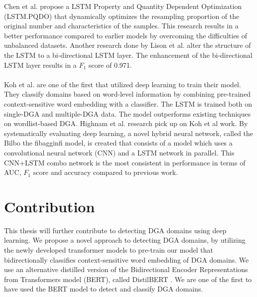 Chen et al. \cite{Chen} propose a LSTM Property and Quantity Dependent Optimization (LSTM.PQDO) that dynamically optimizes the resampling proportion of the original number and characteristics of the samples. This research results in a better performance compared to earlier models by overcoming the difficulties of unbalanced datasets. Another research done by Lison et al. \cite{Lison} alter the structure of the LSTM to a bi-directional LSTM layer. The enhancement of the bi-directional LSTM layer results in a $F_1$ score of 0.971.\\\\
Koh et al. \cite{Koh} are one of the first that utilized deep learning to train their model. They classify domains based on word-level information by combining pre-trained context-sensitive word embedding with a classifier. The LSTM is trained both on single-DGA and multiple-DGA data. The model outperforms existing techniques on wordlist-based DGA.  
Highnam et al. \cite{Highnam} research pick up on Koh et al \cite{Koh} work. By systematically evaluating deep learning, a novel hybrid neural network, called the Bilbo the fibagginfi model, is created that consists of a model which uses a convolutional neural network (CNN) and a LSTM network in parallel. 
This CNN+LSTM combo network is the most consistent in performance in terms of AUC, $F_1$ score and accuracy compared to previous work. 
\section{Contribution}
This thesis will further contribute to detecting DGA domains using deep learning. We propose a novel approach to detecting DGA domains, by utilizing the newly developed transformer models to pre-train our model that bidirectionally classifies context-sensitive word embedding of DGA domains. We use an alternative distilled version of the Bidirectional Encoder Representations from Transformers model (BERT), called DistilBERT \cite{Sanh2019DistilBERTAD}. We are one of the first to have used the BERT model to detect and classify DGA domains.
